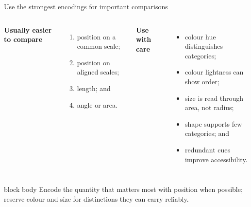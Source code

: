 \documentclass[10pt,aspectratio=169]{beamer}
\begin{document}
\begin{frame}{Use the strongest encodings for important comparisons}

\small

\begin{columns}[T]


\textbf{Usually easier to compare}

\begin{enumerate}
  \item position on a common scale;
  \item position on aligned scales;
  \item length; and
  \item angle or area.
\end{enumerate}


\textbf{Use with care}

\begin{itemize}
  \item colour hue distinguishes categories;
  \item colour lightness can show order;
  \item size is read through area, not radius;
  \item shape supports few categories; and
  \item redundant cues improve accessibility.
\end{itemize}

\end{columns}

\vspace{0.35cm}

\begin{beamercolorbox}[rounded=true,sep=8pt]{block body}
Encode the quantity that matters most with position when possible; reserve colour and size for distinctions they can carry reliably.
\end{beamercolorbox}

\end{frame}
\end{document}
